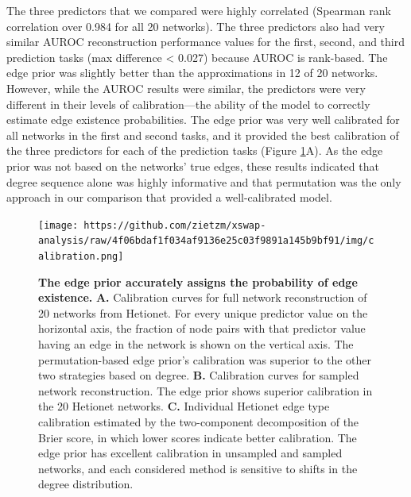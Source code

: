The three predictors that we compared were highly correlated (Spearman rank correlation over 0.984 for all 20 networks).
The three predictors also had very similar AUROC reconstruction performance values for the first, second, and third prediction tasks (max difference \textless{} 0.027) because AUROC is rank-based.
The edge prior was slightly better than the approximations in 12 of 20 networks.
However, while the AUROC results were similar, the predictors were very different in their levels of calibration---the ability of the model to correctly estimate edge existence probabilities.
The edge prior was very well calibrated for all networks in the first and second tasks, and it provided the best calibration of the three predictors for each of the prediction tasks (Figure \ref{fig:calibration}A).
As the edge prior was not based on the networks' true edges, these results indicated that degree sequence alone was highly informative and that permutation was the only approach in our comparison that provided a well-calibrated model.

\begin{figure}
\hypertarget{fig:calibration}{%
\centering
\texttt{[image: https://github.com/zietzm/xswap-analysis/raw/4f06bdaf1f034af9136e25c03f9891a145b9bf91/img/calibration.png]}
\caption{\textbf{The edge prior accurately assigns the probability of edge existence.}
\textbf{A.} Calibration curves for full network reconstruction of 20 networks from Hetionet.
For every unique predictor value on the horizontal axis, the fraction of node pairs with that predictor value having an edge in the network is shown on the vertical axis.
The permutation-based edge prior's calibration was superior to the other two strategies based on degree.
\textbf{B.} Calibration curves for sampled network reconstruction.
The edge prior shows superior calibration in the 20 Hetionet networks.
\textbf{C.} Individual Hetionet edge type calibration estimated by the two-component decomposition of the Brier score, in which lower scores indicate better calibration.
The edge prior has excellent calibration in unsampled and sampled networks, and each considered method is sensitive to shifts in the degree distribution.}\label{fig:calibration}
}
\end{figure}

